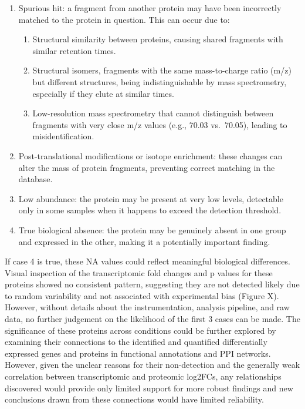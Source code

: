 \begin{enumerate}
\def\labelenumi{\arabic{enumi}.}
\tightlist
\item
  Spurious hit: a fragment from another protein may have been
  incorrectly matched to the protein in question. This can occur due to:

  \begin{enumerate}
  \def\labelenumii{\arabic{enumii}.}
  \tightlist
  \item
    Structural similarity between proteins, causing shared fragments
    with similar retention times.
  \item
    Structural isomers, fragments with the same mass-to-charge ratio
    (m/z) but different structures, being indistinguishable by mass
    spectrometry, especially if they elute at similar times.
  \item
    Low-resolution mass spectrometry that cannot distinguish between
    fragments with very close m/z values (e.g., 70.03 vs.~70.05),
    leading to misidentification.
  \end{enumerate}
\item
  Post-translational modifications or isotope enrichment: these changes
  can alter the mass of protein fragments, preventing correct matching
  in the database.
\item
  Low abundance: the protein may be present at very low levels,
  detectable only in some samples when it happens to exceed the
  detection threshold.
\item
  True biological absence: the protein may be genuinely absent in one
  group and expressed in the other, making it a potentially important
  finding.
\end{enumerate}

If case 4 is true, these NA values could reflect meaningful biological
differences. Visual inspection of the transcriptomic fold changes and p
values for these proteins showed no consistent pattern, suggesting they
are not detected likely due to random variability and not associated
with experimental bias (Figure X). However, without details about the
instrumentation, analysis pipeline, and raw data, no further judgement
on the likelihood of the first 3 cases can be made. The significance of
these proteins across conditions could be further explored by examining
their connections to the identified and quantified differentially
expressed genes and proteins in functional annotations and PPI networks.
However, given the unclear reasons for their non-detection and the
generally weak correlation between transcriptomic and proteomic log2FCs,
any relationships discovered would provide only limited support for more
robust findings and new conclusions drawn from these connections would
have limited reliability.

